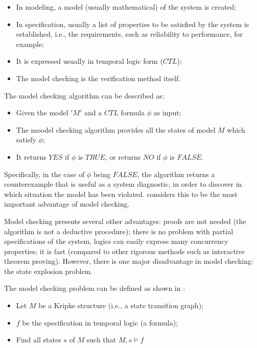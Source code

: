 \begin{itemize}
\item In modeling, a model (usually mathematical) of the system is created; 
\item In specification, usually a list of properties to be satisfied by the system is established, i.e., the requirements, such as reliability to performance, for example; 
\item It is expressed usually in temporal logic form ($CTL$); 
\item The model checking is the verification method itself. 
\end{itemize}

The model checking algorithm can be described as:  

\begin{itemize}
\item Given the model $ 'M' $ and a $CTL$ formula $ \phi $ as input;  
\item The moodel checking algorithm provides all the states of model $ M $ which satisfy $ \phi $;  
\item It returns $YES$ if $ \phi $ is $TRUE$, or returns $NO$ if $ \phi $ is $FALSE$.  

\end{itemize}
Specifically, in the case of $ \phi $ being $FALSE$, the algorithm returns a counterexample that is useful as a system diagnostic, in order to discover in which situation the model has been violated. \cite{Clarke2008} considers this to be the most important advantage of model checking.  
 
Model checking presents several other advantages: proofs are not needed (the algorithm is not a deductive procedure); there is no problem with partial specifications of the system, logics can easily express many concurrency properties; it is fast (compared to other rigorous methods such as interactive theorem proving). However, there is one major disadvantage in model checking: the state explosion problem. 

The model checking problem can be defined as shown in \cite{Clarke2008}: 

\begin{itemize}
\item Let $M$ be a Kripke structure (i.e., a state transition graph);
\item $f$ be the specification in temporal logic (a formula);
\item Find all states $s$ of $M$ such that $M , s \models f$
\end{itemize}

